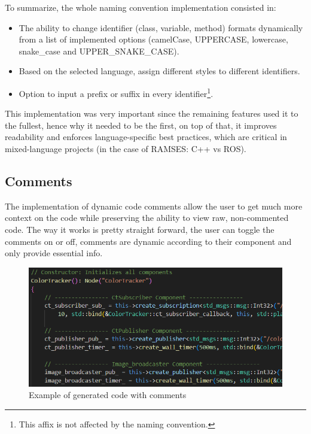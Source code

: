 To summarize, the whole naming convention implementation consisted in:

\begin{itemize} 
	\item The ability to change \gls{identifier} (class, variable, method) formats dynamically from a list of implemented options (camelCase, UPPERCASE, lowercase, snake\_case and UPPER\_SNAKE\_CASE).
	\item Based on the selected language, assign different styles to different \glspl{identifier}.
	\item Option to input a prefix or suffix in every \gls{identifier}\footnote{This affix is not affected by the naming convention.}.
\end{itemize}

This implementation was very important since the remaining features used it to the fullest, hence why it needed to be the first, on top of that, it improves readability and enforces language-specific best practices, which are critical in mixed-language projects (in the case of \gls{RAMSES}: C++ vs ROS).


\subsection{Comments}
\label{sec:impl_comments}

The implementation of dynamic code comments allow the user to get much more context on the code while preserving the ability to view raw, non-commented code. The way it works is pretty straight forward, the user can toggle the comments on or off, comments are dynamic according to their component and only provide essential info.

\begin{figure}[htbp]
	\centering
	\includegraphics[width=\textwidth]{comments.png}
	\caption{Example of generated code with comments}
	\label{fig:comment}
\end{figure}

